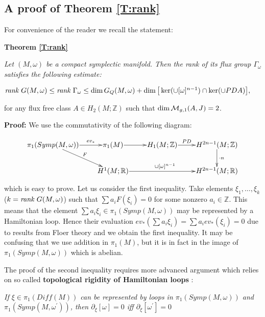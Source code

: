 \documentclass[a4paper,14pt]{article}
\newcommand{\B}[1]{\mathbb #1}
\newcommand{\C}[1]{{\cal #1}}
\newcommand{\om}{{\omega}}
\newcommand{\Ga}{{\Gamma}}
\newcommand{\Mo}{(M,\omega )}
\newcommand{\rank}{{\hbox {\em rank }}}
\newcommand{\pf}{\NI {\bf Proof: }}
\newcommand{\BS}{{\bigskip}}
\newcommand{\NI}{{\noindent}}
\numberwithin{equation}{section}
\begin{document}
\subsection{A proof of Theorem \ref{T:rank}}\label{SS:rank}

For convenience of the reader we recall the statement:


\BS
\NI
{\bf Theorem \ref{T:rank}}
{\em
Let $\Mo $ be a compact symplectic manifold. 
Then the
rank of its flux group $\Ga _{\om }$ satisfies the following
estimate:

\medskip
$\rank G\Mo \leq \rank \Ga _{\om }\leq \dim G_{Q}\Mo + 
\dim \big 
[\ker (\cup [\om ]^{n-1}) \cap \ker (\cup PDA)
\big ],$

\medskip
\NI
for any flux free class $A\in H_2(M;\B Z)$
such that
$\dim \C M_{g,1}(A,J)=2$. 
}
\BS

\NI
\pf
We use the commutativity of the following diagram:

$$
\xymatrix@1{
\pi _1(Symp\Mo ) \ar[r]^-{ev_*} \ar[dr]^F & 
                         \pi _1(M) \ar[r] & 
                 H_1(M;\B Z) \ar[r]^-{PD} & 
          H^{2n-1}(M;\B Z)\ar[d]^{\cdot n}\\
                                          &
   H^1(M;\B R) \ar[rr]^{\cup[\om ]^{n-1}} & 
                                          &
                         H^{2n-1}(M;\B R)                                       
%
}
$$
\BS

\noindent
which is easy to prove. Let us consider the first inequality.
Take elements 
$\xi _1, \dots , \xi _k$ ($k=\rank G\Mo $) such that
$\sum a_iF(\xi _i) = 0$ for some nonzero $a_i\in \B Z$.
This means that the element $\sum a_i\xi _i\in \pi _1(Symp\Mo )$
may be represented by a Hamiltonian loop. Hence their
evaluation $ev_*(\sum a_i\xi _i )= \sum a_i ev_*(\xi _i)=0$
due to results from Floer theory and we obtain the first inequality. 
It may be confusing that we use addition in $\pi _1(M)$, 
but it is in fact in the image of $\pi _1(Symp\Mo )$ which is abelian.

The proof of the second inequality requires more advanced
argument which relies on so called {\bf topological rigidity of
Hamiltonian loops} \cite{lmp2}:

\BS
{\em 
If $\xi \in \pi _1(Diff(M))$ can be represented by loops
in $\pi _1(Symp\Mo )$ and $\pi _1(Symp(M,\om ^{\prime }))$,
then $\partial _{\xi}[\om ]=0$ iff $\partial _{\xi}[\om^{\prime} ]=0$}
\end{document}
